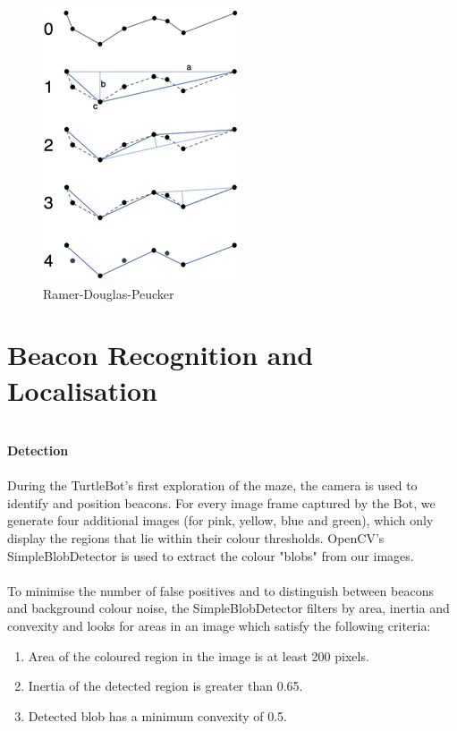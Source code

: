 \documentclass[titlepage,12pt,a4paper]{article}
\begin{document}
\begin{figure}
  	\begin{center}
	\includegraphics[scale=0.7]{rdp.png}
	\caption{Ramer-Douglas-Peucker}
	\end{center}
\end{figure}


\pagebreak


\section*{Beacon Recognition and Localisation}

\large{\textbf{\\Detection}} \\
\normalsize
\\
During the TurtleBot's first exploration of the maze, the camera is used to identify and position beacons. For every image frame captured by the Bot, we generate four additional images (for pink, yellow, blue and green), which only display the regions that lie within their colour thresholds. OpenCV's SimpleBlobDetector is used to extract the colour "blobs" from our images.\\
\\
To minimise the number of false positives and to distinguish between beacons and background colour noise, the SimpleBlobDetector filters by area, inertia and convexity and looks for areas in an image which satisfy the following criteria:

	\begin{enumerate}
		\item Area of the coloured region in the image is at least 200 pixels.
		\item Inertia of the detected region is greater than 0.65.
		\item Detected blob has a minimum convexity of 0.5.\\
	\end{enumerate}
\end{document}
